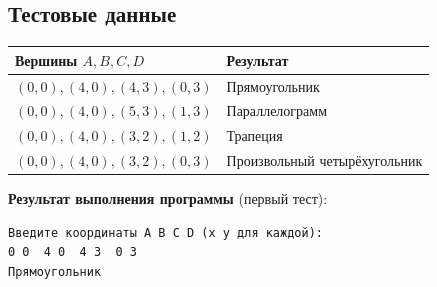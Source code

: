 

\subsection{Тестовые данные}

\begin{center}
\begin{tabular}{l|l}
\toprule
Вершины $A,B,C,D$ & Результат \\
\midrule
$(0,0),(4,0),(4,3),(0,3)$ & Прямоугольник \\
$(0,0),(4,0),(5,3),(1,3)$ & Параллелограмм \\
$(0,0),(4,0),(3,2),(1,2)$ & Трапеция \\
$(0,0),(4,0),(3,2),(0,3)$ & Произвольный четырёхугольник \\
\bottomrule
\end{tabular}
\end{center}

\textbf{Результат выполнения программы} (первый тест):
\begin{lstlisting}[language={},basicstyle=\ttfamily\small,frame=single]
Введите координаты A B C D (x y для каждой):
0 0  4 0  4 3  0 3
Прямоугольник
\end{lstlisting}
